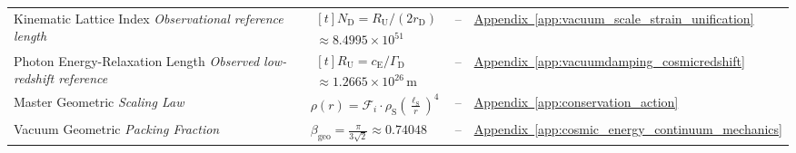 \begin{longtable}{@{} p{4.5cm} p{6cm} c p{4cm} @{}}
{\raggedright Kinematic Lattice Index \newline \textit{Observational reference length}\par} & {\raggedright $\begin{gathered}[t]N_{\mathrm D}=R_{\mathrm U}/(2r_{\mathrm D}) \\ \approx8.4995\times10^{51}\end{gathered}$\par} & -- & {\raggedright \hyperref[app:vacuum_scale_strain_unification]{Appendix~\ref*{app:vacuum_scale_strain_unification}}\par} \\

{\raggedright Photon Energy-Relaxation Length \newline \textit{Observed low-redshift reference}\par} & {\raggedright $\begin{gathered}[t]R_{\mathrm U}=c_{\mathrm E}/\Gamma_{\mathrm D} \\ \approx1.2665\times10^{26}\,\mathrm m\end{gathered}$\par} & -- & {\raggedright \hyperref[app:vacuumdamping_cosmicredshift]{Appendix~\ref*{app:vacuumdamping_cosmicredshift}}\par} \\

{\raggedright Master Geometric \newline \textit{Scaling Law}\par} & {\raggedright $\rho(r) = \mathcal{F}_i \cdot \rho_{\mathrm{S}} \left(\frac{\ell_{\mathrm{S}}}{r}\right)^4$\par} & -- & {\raggedright \hyperref[app:conservation_action]{Appendix~\ref*{app:conservation_action}}\par} \\

{\raggedright Vacuum Geometric \newline \textit{Packing Fraction}\par} & {\raggedright $\beta_{\mathrm{geo}} = \frac{\pi}{3\sqrt{2}} \approx 0.74048$\par} & -- & {\raggedright \hyperref[app:cosmic_energy_continuum_mechanics]{Appendix~\ref*{app:cosmic_energy_continuum_mechanics}}\par} \\


\end{longtable}
